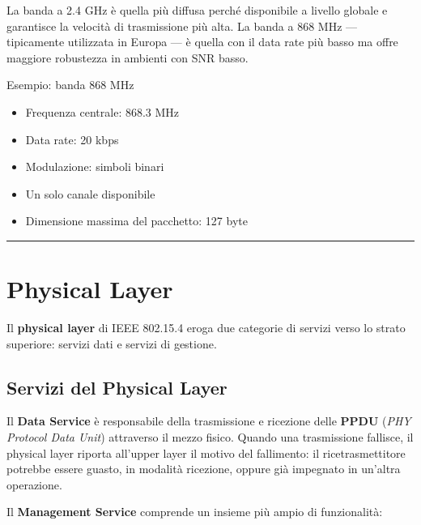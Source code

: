 \documentclass[
  italian,
  openany]{book}
\providecommand{\tightlist}{%
  \setlength{\itemsep}{0pt}\setlength{\parskip}{0pt}}
\begin{document}
La banda a 2.4 GHz è quella più diffusa perché disponibile a livello
globale e garantisce la velocità di trasmissione più alta. La banda a
868 MHz --- tipicamente utilizzata in Europa --- è quella con il data
rate più basso ma offre maggiore robustezza in ambienti con SNR basso.

\begin{callouttip}{Esempio: banda 868 MHz}

\begin{itemize}
\tightlist
\item
  Frequenza centrale: 868.3 MHz
\item
  Data rate: 20 kbps
\item
  Modulazione: simboli binari
\item
  Un solo canale disponibile
\item
  Dimensione massima del pacchetto: 127 byte
\end{itemize}

\end{callouttip}

\begin{center}\rule{0.5\linewidth}{0.5pt}\end{center}

\section{Physical Layer}\label{physical-layer}

Il \textbf{physical layer} di IEEE 802.15.4 eroga due categorie di
servizi verso lo strato superiore: servizi dati e servizi di gestione.

\subsection{Servizi del Physical
Layer}\label{servizi-del-physical-layer}

Il \textbf{Data Service} è responsabile della trasmissione e ricezione
delle \textbf{PPDU} (\emph{PHY Protocol Data Unit}) attraverso il mezzo
fisico. Quando una trasmissione fallisce, il physical layer riporta
all'upper layer il motivo del fallimento: il ricetrasmettitore potrebbe
essere guasto, in modalità ricezione, oppure già impegnato in un'altra
operazione.

Il \textbf{Management Service} comprende un insieme più ampio di
funzionalità:
\end{document}
